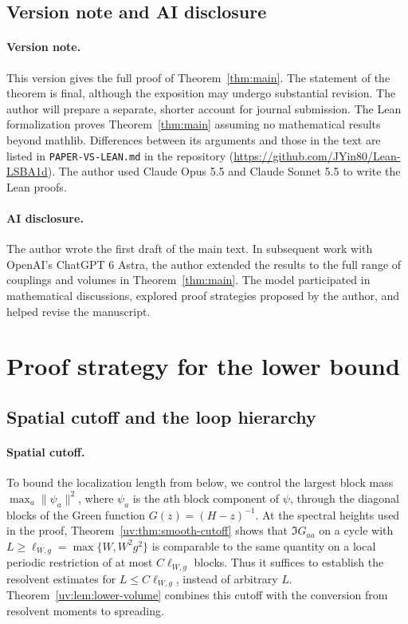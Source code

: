 \documentclass[11pt]{article}
\numberwithin{equation}{section}
\theoremstyle{remark}
\newcommand{\ellscale}{\ell_{W,g}}
\begin{document}
\subsection{Version note and AI disclosure}
\label{sec:version-ai}

\paragraph{Version note.}
This version gives the full proof of Theorem~\ref{thm:main}. The statement
of the theorem is final, although the exposition may undergo substantial
revision. The author will prepare a separate, shorter account for journal
submission. The Lean formalization proves Theorem~\ref{thm:main}
assuming no mathematical results beyond mathlib. Differences between
its arguments and those in the text are listed in
\texttt{PAPER-VS-LEAN.md} in the repository
(\url{https://github.com/JYin80/Lean-LSBA1d}). The author used
Claude Opus 5.5 and Claude Sonnet 5.5 to write the Lean proofs.

\paragraph{AI disclosure.}
The author wrote the first draft of the main text. In subsequent work with
OpenAI's ChatGPT 6 Astra, the author extended the results to the full range
of couplings and volumes in Theorem~\ref{thm:main}. The model participated
in mathematical discussions, explored proof strategies proposed by the
author, and helped revise the manuscript.

\clearpage

\section{Proof strategy for the lower bound}
\label{sec:intro-spreading-methods}

\subsection{Spatial cutoff and the loop hierarchy}

\paragraph{Spatial cutoff.}
To bound the localization length from below, we control the largest
block mass $\max_a\|\psi_a\|^2$, where $\psi_a$ is the $a$th block
component of $\psi$, through the diagonal blocks of the Green function
$G(z)=(H-z)^{-1}$. At the spectral heights used in the proof,
Theorem~\ref{uv:thm:smooth-cutoff} shows that $\Im G_{aa}$ on a cycle
with $L\ge\ellscale=\max\{W,W^2g^2\}$ is comparable to the same
quantity on a local periodic restriction of at most $C\ellscale$
blocks. Thus it suffices to establish the resolvent estimates for
$L\le C\ellscale$, instead of arbitrary $L$.
Theorem~\ref{uv:lem:lower-volume} combines this cutoff with the
conversion from resolvent moments to spreading.
\end{document}
